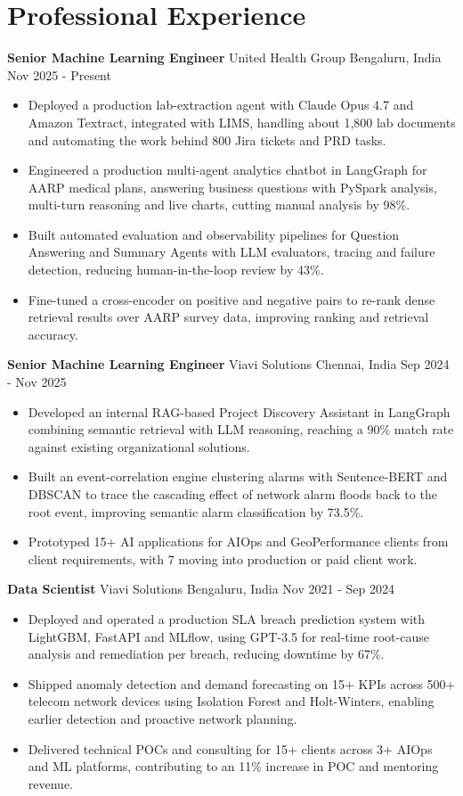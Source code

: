 \documentclass[10pt,a4paper]{article}
\newcommand{\role}[4]{\textbf{#1} \textbar{} #2 \hfill #3 \textbar{} #4\par}
\begin{document}
\section{Professional Experience}
\role{Senior Machine Learning Engineer}{United Health Group}{Bengaluru, India}{Nov 2025 - Present}
\begin{itemize}
  \item Deployed a production lab-extraction agent with Claude Opus 4.7 and Amazon Textract, integrated with LIMS, handling about 1,800 lab documents and automating the work behind 800 Jira tickets and PRD tasks.
  \item Engineered a production multi-agent analytics chatbot in LangGraph for AARP medical plans, answering business questions with PySpark analysis, multi-turn reasoning and live charts, cutting manual analysis by 98\%.
  \item Built automated evaluation and observability pipelines for Question Answering and Summary Agents with LLM evaluators, tracing and failure detection, reducing human-in-the-loop review by 43\%.
  \item Fine-tuned a cross-encoder on positive and negative pairs to re-rank dense retrieval results over AARP survey data, improving ranking and retrieval accuracy.
\end{itemize}
\vspace{3pt}
\role{Senior Machine Learning Engineer}{Viavi Solutions}{Chennai, India}{Sep 2024 - Nov 2025}
\begin{itemize}
  \item Developed an internal RAG-based Project Discovery Assistant in LangGraph combining semantic retrieval with LLM reasoning, reaching a 90\% match rate against existing organizational solutions.
  \item Built an event-correlation engine clustering alarms with Sentence-BERT and DBSCAN to trace the cascading effect of network alarm floods back to the root event, improving semantic alarm classification by 73.5\%.
  \item Prototyped 15+ AI applications for AIOps and GeoPerformance clients from client requirements, with 7 moving into production or paid client work.
\end{itemize}
\vspace{3pt}
\role{Data Scientist}{Viavi Solutions}{Bengaluru, India}{Nov 2021 - Sep 2024}
\begin{itemize}
  \item Deployed and operated a production SLA breach prediction system with LightGBM, FastAPI and MLflow, using GPT-3.5 for real-time root-cause analysis and remediation per breach, reducing downtime by 67\%.
  \item Shipped anomaly detection and demand forecasting on 15+ KPIs across 500+ telecom network devices using Isolation Forest and Holt-Winters, enabling earlier detection and proactive network planning.
  \item Delivered technical POCs and consulting for 15+ clients across 3+ AIOps and ML platforms, contributing to an 11\% increase in POC and mentoring revenue.
\end{itemize}
\end{document}
